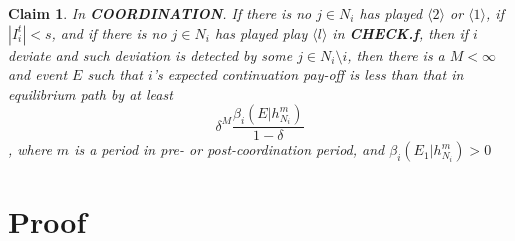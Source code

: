 \documentclass[12pt]{article}
\newtheorem{claim}{Claim}[subsubsection]
\theoremstyle{remark}
\theoremstyle{remark}
\begin{document}
\begin{claim} 
\label{claim_detection_coordination_period}
In \textbf{COORDINATION}. If there is no $j\in N_i$ has played $\langle 2 \rangle$ or $\langle 1 \rangle$, if $|I^t_i|<s$, and if there is no $j\in N_i$ has played play $\langle l \rangle$ in \textbf{CHECK.f}, then if $i$ deviate and such deviation is detected by some $j\in N_i\setminus i$, then there is a $M<\infty$ and event $E$ such that $i$'s expected continuation pay-off is less than that in equilibrium path by at least 
\[\delta^{M}\frac{\beta_{i}(E|h^{m}_{N_i})}{1-\delta}\]
, where $m$ is a period in pre- or post-coordination period, and $\beta_{i}(E_1|h^{m}_{N_i})>0$
\end{claim}



\appendix
\section{Proof}
\end{document}
